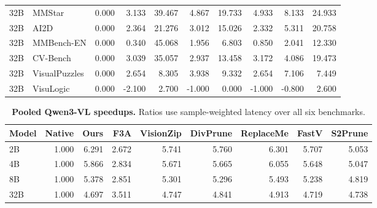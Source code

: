 \documentclass[10pt,a4paper,landscape]{article}
\newcommand{\tnote}[1]{\par\vspace{3pt}{\footnotesize #1}\par}
\begin{document}
\begin{table}[!ht]
\begin{tabular}{@{}llrrrrrrrr@{}}
\midrule
32B & MMStar & 0.000 & 3.133 & 39.467 & 4.867 & 19.733 & 4.933 & 8.133 & 24.933\\
32B & AI2D & 0.000 & 2.364 & 21.276 & 3.012 & 15.026 & 2.332 & 5.311 & 20.758\\
32B & MMBench-EN & 0.000 & 0.340 & 45.068 & 1.956 & 6.803 & 0.850 & 2.041 & 12.330\\
32B & CV-Bench & 0.000 & 3.039 & 35.057 & 2.937 & 13.458 & 3.172 & 4.086 & 19.473\\
32B & VisualPuzzles & 0.000 & 2.654 & 8.305 & 3.938 & 9.332 & 2.654 & 7.106 & 7.449\\
32B & VisuLogic & 0.000 & -2.100 & 2.700 & -1.000 & 0.000 & -1.000 & -0.800 & 2.600\\
\bottomrule\end{tabular}
\tnote{Loss = Native accuracy $-$ method accuracy; negative values indicate an accuracy increase. Accuracy equality does not imply identical per-example predictions. MMBench-EN uses provided-pass group accuracy, not full official CircularEval; 53 groups are incomplete. CV-Bench uses source-balanced accuracy; the other benchmarks use forced-choice exact accuracy. Three repetitions are timing replicates, not independent training seeds.}
\end{table}
\begin{table}[!ht]\centering
\caption{\textbf{Pooled Qwen3-VL speedups.} Ratios use sample-weighted latency over all six benchmarks.}
\small
\begin{tabular}{@{}lrrrrrrrr@{}}\toprule
Model & Native & Ours & F3A & VisionZip & DivPrune & ReplaceMe & FastV & S2Prune\\\midrule
2B & 1.000 & 6.291 & 2.672 & 5.741 & 5.760 & 6.301 & 5.707 & 5.053\\
4B & 1.000 & 5.866 & 2.834 & 5.671 & 5.665 & 6.055 & 5.648 & 5.047\\
8B & 1.000 & 5.378 & 2.851 & 5.301 & 5.296 & 5.493 & 5.238 & 4.819\\
32B & 1.000 & 4.697 & 3.511 & 4.747 & 4.841 & 4.913 & 4.719 & 4.738\\
\bottomrule\end{tabular}
\tnote{These measurements belong to the main comparison cohort. Earlier standalone measurements are retained as historical results and are not substituted into this table.}
\end{table}
\clearpage
\end{document}
